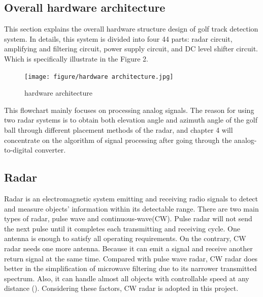 \subsection{Overall hardware architecture}
This section explains the overall hardware structure design of golf track detection system. In details, this system is divided into four 
44
 parts: radar circuit, amplifying and filtering circuit, power supply circuit, and DC level shifter circuit. Which is specifically illustrate in the Figure 2.
\begin{figure}[H]
    \centering
    \texttt{[image: figure/hardware
    architecture.jpg]}
    \caption{hardware architecture}
\end{figure}
This flowchart mainly focuses on processing analog signals. The reason for using two radar systems is to obtain both elevation angle and azimuth angle of the golf ball through different placement methods of the radar, and chapter 4 will concentrate on the algorithm of signal processing after going through the analog-to-digital converter.
\subsection{Radar}
Radar is an electromagnetic system emitting and receiving radio signals to detect and measure objects’ information within its detectable range. There are two main types of radar, pulse wave and continuous-wave(CW). Pulse radar will not send the next pulse until it completes each transmitting and receiving cycle. One antenna is enough to satisfy all operating requirements. On the contrary, CW radar needs one more antenna. Because it can emit a signal and receive another return signal at the same time. Compared with pulse wave radar, CW radar does better in the simplification of microwave filtering due to its narrower transmitted spectrum. Also, it can handle almost all objects with controllable speed at any distance (\cite{skolnik1970radar}). Considering these factors, CW radar is adopted in this project. 

